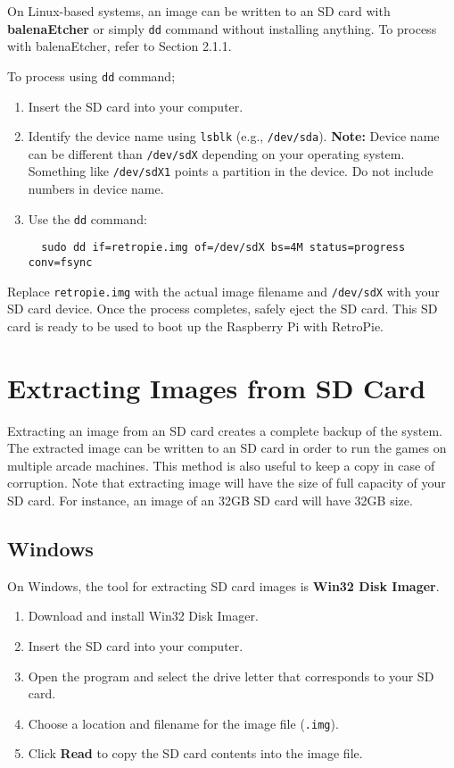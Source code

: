 On Linux-based systems, an image can be written to an SD card with \textbf{balenaEtcher} or simply \texttt{dd} command without installing anything. To process with balenaEtcher, refer to Section 2.1.1.

To process using \texttt{dd} command;
\begin{enumerate}
  \item Insert the SD card into your computer.
  \item Identify the device name using \texttt{lsblk} (e.g., \texttt{/dev/sda}).
    \newline\textbf{Note:} Device name can be different than \texttt{/dev/sdX} depending on your operating system. Something like \texttt{/dev/sdX1} points a partition in the device. Do not include numbers in device name.
  \item Use the \texttt{dd} command:
  \begin{verbatim}
  sudo dd if=retropie.img of=/dev/sdX bs=4M status=progress conv=fsync
  \end{verbatim}
\end{enumerate}

Replace \texttt{retropie.img} with the actual image filename and \texttt{/dev/sdX} with your SD card device. Once the process completes, safely eject the SD card. This SD card is ready to be used to boot up the Raspberry Pi with RetroPie.


\section{Extracting Images from SD Card}
\label{sec:extracting_images_sd_card}

Extracting an image from an SD card creates a complete backup of the system. The extracted image can be written to an SD card in order to run the games on multiple arcade machines. This method is also useful to keep a copy in case of corruption. Note that extracting image will have the size of full capacity of your SD card. For instance, an image of an 32GB SD card will have 32GB size.

\subsection{Windows}
\label{subsec:extracting_windows}

On Windows, the tool for extracting SD card images is \textbf{Win32 Disk Imager}.
\begin{enumerate}
  \item Download and install Win32 Disk Imager.
  \item Insert the SD card into your computer.
  \item Open the program and select the drive letter that corresponds to your SD card.
  \item Choose a location and filename for the image file (\texttt{.img}).
  \item Click \textbf{Read} to copy the SD card contents into the image file.
\end{enumerate}

